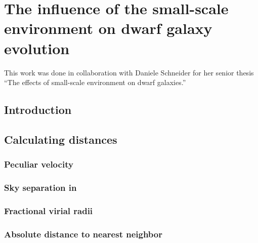 \chapter[Small-scale environment]{The influence of the small-scale environment on dwarf galaxy evolution}


This work was done in collaboration with Daniele Schneider for her senior thesis 
``The effects of small-scale environment on dwarf galaxies.''




\section[Introduction]{Introduction}





\section[Theory]{Calculating distances}\label{sec:Theory_dist}


\subsection{Peculiar velocity}


\subsection{Sky separation in \hMpc}


\subsection{Fractional virial radii}


\subsection{Absolute distance to nearest neighbor}




